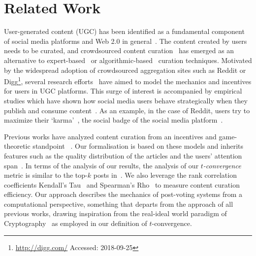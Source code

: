 \section{Related Work}
User-generated content (UGC) has been identified as a fundamental component of social media platforms and Web 2.0 in general~\cite{kaplan2010users}. The content created by users needs to be curated, and crowdsourced content curation~\cite{askalidis2013theoretical} has emerged as an alternative to expert-based~\cite{stanoevska2012content} or algorithmic-based~\cite{rader2015understanding} curation techniques. Motivated by the widespread adoption of crowdsourced aggregation sites such as Reddit or Digg\footnote{\url{http://digg.com/} Accessed: 2018-09-25}, several research efforts~\cite{das2010ranking,ghosh2011incentivizing,abbassi2014distributed} have aimed to model the mechanics and incentives for users in UGC platforms. This surge of interest is accompanied by empirical studies which have shown how
social media users behave strategically when they publish and consume content~\cite{may2014filter}. As an example, in the case of Reddit, users try to maximize their `karma'~\cite{bergstrom2011don}, the social badge of the social media platform~\cite{anderson2013steering}.

Previous works have analyzed content curation from an incentives and game-theoretic standpoint~\cite{ghosh2011incentivizing,das2010ranking,gupte2009news,may2014filter,abbassi2014distributed} . Our formalisation is based on these models and inherits features such as the quality distribution of the articles and the users' attention span~\cite{askalidis2013theoretical,ghosh2011incentivizing}. In terms of the analysis of our results, the analysis of our \textit{$t$-convergence} metric is similar to the top-$k$ posts in~\cite{askalidis2013theoretical}. We also leverage the rank correlation coefficients Kendall's Tau~\cite{kendall1955rank} and Spearman's Rho~\cite{spearman1904proof} to measure content curation efficiency.
Our approach describes the mechanics of post-voting systems from a computational perspective, something that departs from the approach of all previous works, drawing inspiration from the real-ideal world paradigm of Cryptography~\cite{goldreich1999foundations,lindell} as employed in our definition of $t$-convergence.


